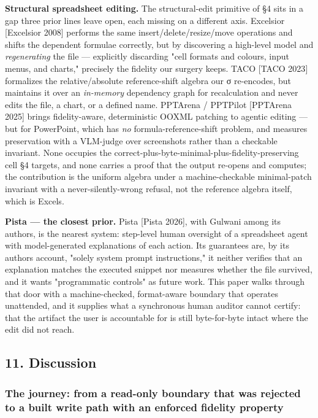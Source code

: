 \documentclass[
]{article}
\newcounter{none} %
\begin{document}
\textbf{Structural spreadsheet editing.} The structural-edit primitive
of §4 sits in a gap three prior lines leave open, each missing on a
different axis. Excelsior {[}Excelsior 2008{]} performs the same
insert/delete/resize/move operations and shifts the dependent formulae
correctly, but by discovering a high-level model and \emph{regenerating}
the file --- explicitly discarding "cell formats and colours, input
menus, and charts," precisely the fidelity our surgery keeps. TACO
{[}TACO 2023{]} formalizes the relative/absolute reference-shift algebra
our σ re-encodes, but maintains it over an \emph{in-memory} dependency
graph for recalculation and never edits the file, a chart, or a defined
name. PPTArena / PPTPilot {[}PPTArena 2025{]} brings fidelity-aware,
deterministic OOXML patching to agentic editing --- but for PowerPoint,
which has \emph{no} formula-reference-shift problem, and measures
preservation with a VLM-judge over screenshots rather than a checkable
invariant. None occupies the
correct-plus-byte-minimal-plus-fidelity-preserving cell §4 targets, and
none carries a proof that the output re-opens and computes; the
contribution is the uniform algebra under a machine-checkable
minimal-patch invariant with a never-silently-wrong refusal, not the
reference algebra itself, which is Excel\textquotesingle s.

\textbf{Pista --- the closest prior.} Pista {[}Pista 2026{]}, with
Gulwani among its authors, is the nearest system: step-level human
oversight of a spreadsheet agent with model-generated explanations of
each action. Its guarantees are, by its authors\textquotesingle{}
account, "solely system prompt instructions," it neither verifies that
an explanation matches the executed snippet nor measures whether the
file survived, and it wants "programmatic controls" as future work. This
paper walks through that door with a machine-checked, format-aware
boundary that operates unattended, and it supplies what a synchronous
human auditor cannot certify: that the artifact the user is accountable
for is still byte-for-byte intact where the edit did not reach.

\subsection{11. Discussion}\label{11-discussion}

\subsubsection{The journey: from a read-only boundary that was rejected
to a built write path with an enforced fidelity
property}\label{the-journey-from-a-read-only-boundary-that-was-rejected-to-a-built-write-path-with-an-enforced-fidelity-property}
\end{document}
